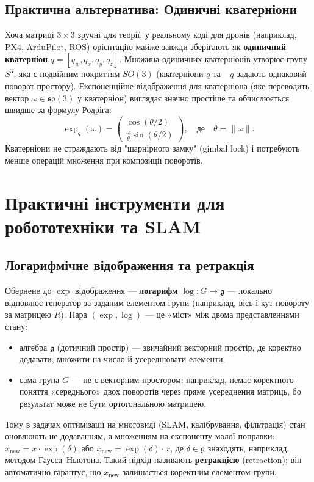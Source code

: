 \documentclass[12pt, a4paper]{article}
\begin{document}
	\subsection{Практична альтернатива: Одиничні кватерніони}
	Хоча матриці $3\times3$ зручні для теорії, у реальному коді для дронів (наприклад, PX4, ArduPilot, ROS) орієнтацію майже завжди зберігають як \textbf{одиничний кватерніон} $q = [q_w, q_x, q_y, q_z]$. Множина одиничних кватерніонів утворює групу $S^3$, яка є подвійним покриттям $SO(3)$ (кватерніони $q$ та $-q$ задають однаковий поворот простору). Експоненційне відображення для кватерніона (яке переводить вектор $\omega \in \mathfrak{so}(3)$ у кватерніон) виглядає значно простіше та обчислюється швидше за формулу Родріга:
	\[
	\exp_q(\omega) = \begin{pmatrix} \cos(\theta/2) \\ \frac{\omega}{\theta} \sin(\theta/2) \end{pmatrix}, \quad \text{де} \quad \theta = \|\omega\|.
	\]
	Кватерніони не страждають від "шарнірного замку" (gimbal lock) і потребують менше операцій множення при композиції поворотів.
	
	\section{Практичні інструменти для робототехніки та SLAM}
	
	\subsection{Логарифмічне відображення та ретракція}
	Обернене до $\exp$ відображення — \textbf{логарифм} $\log: G \to \mathfrak{g}$ — локально відновлює генератор за заданим елементом групи (наприклад, вісь і кут повороту за матрицею $R$). Пара $(\exp, \log)$ — це «міст» між двома представленнями стану:
	\begin{itemize}
		\item алгебра $\mathfrak{g}$ (дотичний простір) — звичайний векторний простір, де коректно додавати, множити на число й усереднювати елементи;
		\item сама група $G$ — не є векторним простором: наприклад, немає коректного поняття «середнього» двох поворотів через пряме усереднення матриць, бо результат може не бути ортогональною матрицею.
	\end{itemize}
	Тому в задачах оптимізації на многовиді (SLAM, калібрування, фільтрація) стан оновлюють не додаванням, а множенням на експоненту малої поправки: $x_{\text{new}} = x \cdot \exp(\delta)$ або $x_{\text{new}} = \exp(\delta) \cdot x$, де $\delta \in \mathfrak{g}$ знаходять, наприклад, методом Гаусса--Ньютона. Такий підхід називають \textbf{ретракцією} (retraction); він автоматично гарантує, що $x_{\text{new}}$ залишається коректним елементом групи. 
	
\end{document}
